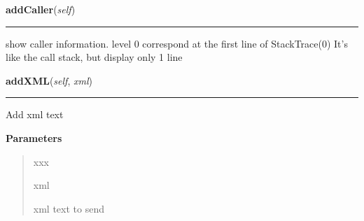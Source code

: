     \label{tracetool:TraceNodeEx:addCaller}

    \vspace{0.5ex}

\hspace{.8\funcindent}\begin{boxedminipage}{\funcwidth}

    \raggedright \textbf{addCaller}(\textit{self})

    \vspace{-1.5ex}

    \rule{\textwidth}{0.5\fboxrule}
\setlength{\parskip}{2ex}
    show caller information. level 0 correspond at the first line of 
    StackTrace(0) It's like the call stack, but display only 1 line

\setlength{\parskip}{1ex}
    \end{boxedminipage}

    \label{tracetool:TraceNodeEx:addXML}

    \vspace{0.5ex}

\hspace{.8\funcindent}\begin{boxedminipage}{\funcwidth}

    \raggedright \textbf{addXML}(\textit{self}, \textit{xml})

    \vspace{-1.5ex}

    \rule{\textwidth}{0.5\fboxrule}
\setlength{\parskip}{2ex}
    Add xml text

\setlength{\parskip}{1ex}
      \textbf{Parameters}
      \vspace{-1ex}

      \begin{quote}
        \begin{Ventry}{xxx}

          \item[xml]

          xml text to send

        \end{Ventry}

      \end{quote}

    \end{boxedminipage}

